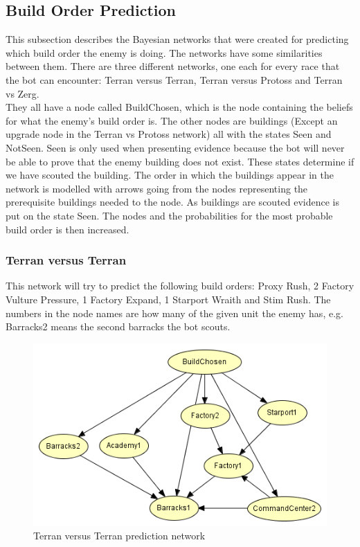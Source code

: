 \subsection{Build Order Prediction}
	This subsection describes the Bayesian networks that were created for predicting which build order the enemy is doing. 
	The networks have some similarities between them. There are three different networks, one each for every race that the bot can encounter: 
	Terran versus Terran, Terran versus Protoss and Terran vs Zerg.  \\
	
	They all have a node called BuildChosen, which is the node containing the beliefs for what the enemy's build order is. 
	The other nodes are buildings (Except an upgrade node in the Terran vs Protoss network) all with the states Seen and NotSeen. Seen is only used when presenting evidence because the bot will never be able to prove that the enemy building does not exist. 
	These states determine if we have scouted the building. 
	The order in which the buildings appear in the network is modelled with arrows going from the nodes representing the prerequisite buildings needed to the node. 
	As buildings are scouted evidence is put on the state Seen. The nodes and the probabilities for the most probable build order is then increased.

\subsubsection{Terran versus Terran}
	This network will try to predict the following build orders: Proxy Rush, 2 Factory Vulture Pressure, 1 Factory Expand, 1 Starport Wraith and Stim Rush. 
	The numbers in the node names are how many of the given unit the enemy has, e.g. Barracks2 means the second barracks the bot scouts. 
	
\begin{figure}[H]
	\includegraphics{Figures/BayesianPictures/tvt.png}
	\caption{Terran versus Terran prediction network}
	\label{fig:tvtnetwork}
\end{figure}			
